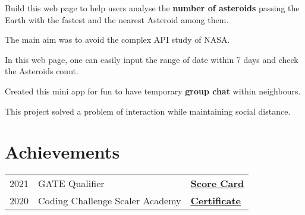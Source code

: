 \documentclass[]{deedy-resume-openfont}
\begin{document}
\begin{minipage}[t]{0.66\textwidth}
\sectionsep

{\href{https://niharika100.github.io/nearEarthObjectStats/}{\bf{}}}
\begin{tightemize}
\item Build this web page to help users analyse the \textbf{number of asteroids} passing the Earth with the fastest and the nearest Asteroid among them.
\item The main aim was to avoid the complex API study of NASA. 
\item In this web page, one can easily input the range of date within 7 days and check the Asteroids count.
\end{tightemize}
\sectionsep

{\href{https://github.com/Niharika100/WebChatApp}{\bf{}}}
\begin{tightemize}
\item Created this mini app for fun to have temporary \textbf{group chat} within neighbours.
\item This project solved a problem of interaction while maintaining social distance.
\end{tightemize}
\sectionsep


\section{Achievements} 
\begin{tabular}{rll}
2021	     & GATE Qualifier  & \bf{\href{https://drive.google.com/file/d/15GE8USUrYsOLWMyxbJCKXGUEODwfVKVF/view?usp=sharing}{Score Card}}\\
2020     & Coding Challenge Scaler Academy &  \bf{\href{https://drive.google.com/file/d/1FvnQb3Byb9vj0uEbBudwzwYHRNe2MFp1/view}{Certificate}} \\
\end{tabular}
\sectionsep

\end{minipage} 
\end{document}
